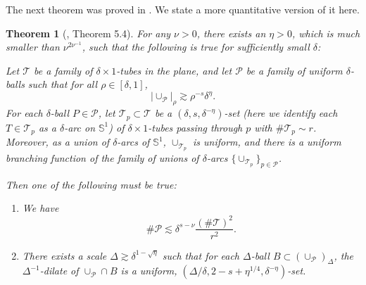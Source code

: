 \documentclass{amsart}
\numberwithin{equation}{section}
\newtheorem{theorem}{Theorem}[section]
\newcommand{\de}{\delta}
\newcommand{\De}{\Delta}
\newcommand{\cp}{\mathcal P}
\newcommand{\ZS}{\mathbb{S}}
\newcommand{\cT}{{\mathcal T}}
\begin{document}
\smallskip

The next theorem was proved in \cite{Demeter-Wang}. We state a more quantitative version of it here.

\begin{theorem}[\cite{Demeter-Wang}, Theorem 5.4]
\label{DW-24}
For any $\nu>0$, there exists an $\eta>0$, which is much smaller than $\nu^{2\nu^{-1}}$, such that the following is true for sufficiently small $\de$: 

Let $\cT$ be a family of $\de\times 1$-tubes in the plane, and let $\cp$ be a family of uniform $\de$-balls such that for all $\rho\in[\de,1]$,
\begin{equation}
    |\cup_\cp|_\rho\gtrsim\rho^{-s}\de^{\eta}.
\end{equation}
For each $\de$-ball $P\in\cp$, let $\cT_p\subset\cT$ be a $(\de,s,\de^{-\eta})$-set 
(here we identify each $T\in\cT_p$ as a $\de$-arc on $\ZS^1$) of $\de\times1$-tubes passing through $p$ with $\#\cT_p\sim r$. 
Moreover, as a union of $\de$-arcs of $\ZS^1$, $\cup_{\cT_p}$ is uniform, and there is a uniform branching function of the family of unions of $\de$-arcs $\{\cup_{\cT_p}\}_{p\in\cp}$.

Then one of the following must be true:
\begin{enumerate}
    \item We have
    \begin{equation}
        \#\cp \lesssim\de^{s-\nu}\frac{(\#\cT)^2}{r^2}.
    \end{equation}
    \item There exists a scale $\De\gtrsim \de^{1-\sqrt{\eta}}$ such that for each $\De$-ball $B\subset (\cup_\cp)_\De$, the $\De^{-1}$-dilate of $\cup_\cp\cap B$ is a uniform, $(\De/\de, 2-s+\eta^{1/4}, \de^{-\eta})$-set.
\end{enumerate}

\end{theorem}
\end{document}
